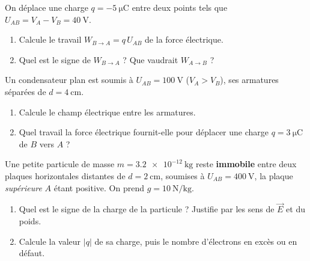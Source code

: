 \documentclass[11pt,a4paper]{article}
\newcommand{\vv}[1]{\vec{#1}}\newcommand{\ds}{\displaystyle}
\begin{document}

\begin{exo}
On déplace une charge $q = \SI{-5}{\micro\coulomb}$ entre deux points tels que
$U_{AB} = V_A - V_B = \SI{+40}{\volt}$.
\begin{enumerate}[label=\alph*)]
  \item Calcule le travail $W_{B\to A} = q\,U_{AB}$ de la force électrique.
  \item Quel est le signe de $W_{B\to A}$ ? Que vaudrait $W_{A\to B}$ ?
\end{enumerate}
\end{exo}

\begin{exo}
Un condensateur plan est soumis à $U_{AB} = \SI{100}{\volt}$ ($V_A > V_B$), ses armatures séparées
de $d = \SI{4}{\centi\metre}$.
\begin{enumerate}[label=\alph*)]
  \item Calcule le champ électrique entre les armatures.
  \item Quel travail la force électrique fournit-elle pour déplacer une charge
        $q = \SI{+3}{\micro\coulomb}$ de $B$ vers $A$ ?
\end{enumerate}
\end{exo}

\begin{exo}
Une petite particule de masse $m = \SI{3.2e-12}{\kilogram}$ reste \textbf{immobile} entre deux
plaques horizontales distantes de $d = \SI{2}{\centi\metre}$, soumises à $U_{AB} = \SI{400}{\volt}$,
la plaque \emph{supérieure} $A$ étant positive. On prend $g = \SI{10}{\newton\per\kilogram}$.
\begin{center}
\end{center}
\begin{enumerate}[label=\alph*)]
  \item Quel est le signe de la charge de la particule ? Justifie par les sens de $\vv{E}$ et du poids.
  \item Calcule la valeur $|q|$ de sa charge, puis le nombre d'électrons en excès ou en défaut.
\end{enumerate}
\end{exo}
\end{document}
